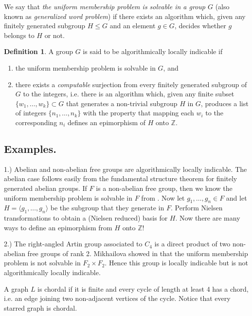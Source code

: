 \documentclass[12pt, a4paper]{amsart}
\theoremstyle{remark}
\theoremstyle{definition}
\newtheorem{Def}[Thm]{Definition}
\begin{document}
We say that \emph{the uniform membership problem is solvable in a group $G$} (also known as \emph{generalized word problem}) if there exists an algorithm which, given any finitely generated subgroup $H\leq G$ and an element $g \in G$, decides whether $g$ belongs to $H$ or not. 

\begin{Def}\label{ALI} A group $G$ is said to be algorithmically locally indicable if
\begin{enumerate}
\item the uniform membership problem is solvable in $G$, and 
\item \label{map} there exists a \textit{computable} surjection from every finitely generated subgroup of $G$ to the integers, i.e. there is an algorithm which, given any finite subset $\{w_1,\ldots, w_k\}\subset G$ that generates a non-trivial subgroup $H$ in $G$, produces a list of integers $\{n_1, \ldots, n_k\}$ with the property that mapping each $w_i$ to the corresponding $n_i$ defines an epimorphism of $H$ onto $\mathbb{Z}$. 
\end{enumerate} 
\end{Def}

\subsection*{Examples. } 1.) Abelian and non-abelian free groups are algorithmically locally indicable. The abelian case follows easily from the fundamental structure theorem for finitely generated abelian groups. If $F$ is a non-abelian free group, then we know the uniform membership problem is solvable in $F$ from \cite{LyndonSchupp}. Now let $g_1, \ldots,g_n \in F$ and let $H=\langle g_1, \ldots,g_n \rangle$ be the subgroup that they generate in $F$. Perform Nielsen transformations to obtain a (Nielsen reduced) basis for $H$. Now there are many ways to define an epimorphism from $H$ onto $\mathbb{Z}$!

2.) The right-angled Artin group associated to $C_4$ is a direct product of two non-abelian free groups of rank 2. Mikhailova showed in \cite{Mikhailova} that the uniform membership problem is not solvable in $F_2 \times F_2$. Hence this group is locally indicable but is not algorithmically locally indicable.  
\medskip

A graph $L$ is chordal if it is finite and every cycle of length at least 4 has a chord, i.e. an edge joining two non-adjacent vertices of the cycle. Notice that every starred graph is chordal.
\end{document}
